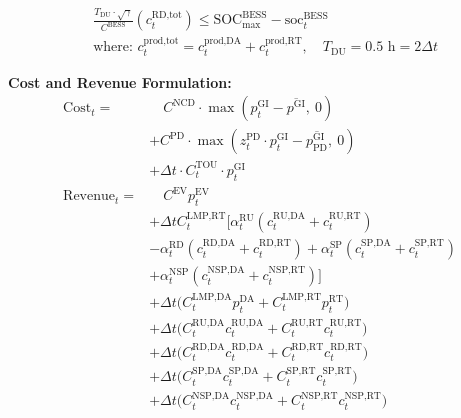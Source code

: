 \documentclass[conference]{IEEEtran}
\begin{document}
{\begin{align}
    & \frac{T_{\text{DU}} \cdot \sqrt{\gamma}}{C^{\text{BESS}}} \left( c_{t}^{\text{RD,tot}} \right) \le \text{SOC}_{\max}^{\text{BESS}} - \text{soc}_{t}^{\text{BESS}} \\
    & \text{where: } c_{t}^{\text{prod,tot}} = c_{t}^{\text{prod,DA}} + c_{t}^{\text{prod,RT}}, \quad T_{\text{DU}} = 0.5 \text{ h} = 2 \Delta t \nonumber
\end{align}






\noindent \textbf{Cost and Revenue Formulation:}
\begin{align}
    \text{Cost}_t = & \quad C^{\text{NCD}} \cdot \max \left( p_{t}^{\text{GI}} - \overline{p^{\text{GI}}}, \ 0 \right) \\
    & + C^{\text{PD}} \cdot \max \left( z_{t}^{\text{PD}} \cdot p_{t}^{\text{GI}} - \overline{p^{\text{GI}}_{\text{PD}}}, \ 0 \right) \\
    & + \Delta t \cdot C_t^{\text{TOU}} \cdot p_{t}^{\text{GI}} \\
    \text{Revenue}_t = & \quad C^{\text{EV}} p_{t}^{\text{EV}} \nonumber \\
    & + \Delta t  C_{t}^{\text{LMP,RT}} \Big[ \alpha_{t}^{\text{RU}} (c_{t}^{\text{RU,DA}} + c_{t}^{\text{RU,RT}}) \nonumber \\
    & - \alpha_{t}^{\text{RD}} (c_{t}^{\text{RD,DA}} + c_{t}^{\text{RD,RT}}) 
    + \alpha_{t}^{\text{SP}} (c_{t}^{\text{SP,DA}} + c_{t}^{\text{SP,RT}}) \nonumber \\
    & + \alpha_{t}^{\text{NSP}} (c_{t}^{\text{NSP,DA}} + c_{t}^{\text{NSP,RT}}) \Big] \nonumber \\
    & + \Delta t \Big(C_{t}^{\text{LMP,DA}}  p_{t}^{\text{DA}} + C_{t}^{\text{LMP,RT}} p_{t}^{\text{RT}} \Big) \nonumber \\
    & + \Delta t \Big( C_{t}^{\text{RU,DA}} c_{t}^{\text{RU,DA}} + C_{t}^{\text{RU,RT}} c_{t}^{\text{RU,RT}} \Big) \nonumber \\
    & + \Delta t \Big( C_{t}^{\text{RD,DA}} c_{t}^{\text{RD,DA}} + C_{t}^{\text{RD,RT}} c_{t}^{\text{RD,RT}} \Big) \nonumber \\
    & + \Delta t \Big( C_{t}^{\text{SP,DA}} c_{t}^{\text{SP,DA}} + C_{t}^{\text{SP,RT}} c_{t}^{\text{SP,RT}} \Big) \nonumber \\
    & + \Delta t \Big( C_{t}^{\text{NSP,DA}} c_{t}^{\text{NSP,DA}} + C_{t}^{\text{NSP,RT}} c_{t}^{\text{NSP,RT}} \Big)
\end{align}

}
\end{document}
